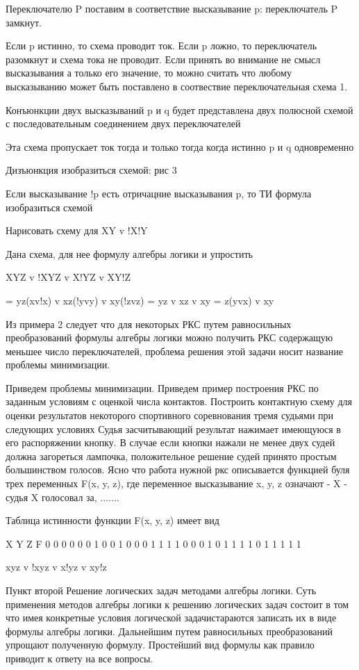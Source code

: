 Переключателю P поставим в соответствие высказывание p:
переключатель P замкнут. 

Если p истинно, то схема проводит ток. Если p ложно, то переключатель разомкнут и схема тока не проводит.
Если принять во внимание не смысл высказывания а только его значение, то можно считать что любому высказыванию может быть поставлено в соотвествие переключательная схема 1.

Конъюнкции двух высказываний p и q будет представлена двух полюсной схемой с последовательным соединением двух переключателей

Эта схема пропускает ток тогда и только тогда когда истинно p и q одновременно

Дизъюнкция изобразиться схемой: рис 3

Если высказывание !p есть отричацние высказывания p, то ТИ формула изобразиться схемой

Нарисовать схему для
XY v !X!Y

Дана схема, для нее формулу алгебры логики и упростить

XYZ v !XYZ v X!YZ v XY!Z 

= yz(xv!x) v xz(!yvy) v xy(!zvz)
= yz v xz v xy = z(yvx) v xy

Из примера 2 следует что для некоторых РКС путем равносильных преобразований формулы алгебры логики можно получить РКС содержащую меньшее число переключателей, проблема решения этой задачи носит название проблемы минимизации.

Приведем проблемы минимизации.
Приведем пример построения РКС по заданным условиям с оценкой числа контактов.
Построить контактную схему для оценки результатов некоторого спортивного соревнования тремя судьями при следующих условиях
Судья засчитывающий результат нажимает имеющуюся в его распоряжении кнопку.
В случае если кнопки нажали не менее двух судей должна загореться лампочка, положительное решение судей принято простым большинством голосов. Ясно что работа нужной ркс описывается функцией буля трех переменных F(x, y, z), где переменное высказывание x, y, z означают - X - судья X голосовал за, .......


Таблица истинности функции F(x, y, z) имеет вид

X Y Z F
0 0 0 0
0 0 1 0
0 1 0 0
0 1 1 1
1 0 0 0
1 0 1 1
1 1 0 1
1 1 1 1

xyz v !xyz v x!yz v xy!z

Пункт второй
Решение логических задач методами алгебры логики.
Суть применения методов алгебры логики к решению логических задач состоит в том что имея конкретные условия логической задачистараются записать их в виде формулы алгебры логики. Дальнейшим путем равносильных преобразований упрощают полученную формулу. Простейший вид формулы как правило приводит к ответу на все вопросы.


